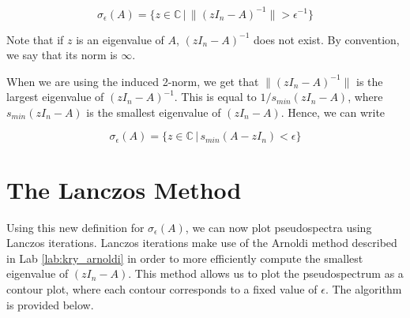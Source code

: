 \begin{equation}
\sigma _{\epsilon}(A) = \{ z \in \mathbb{C} \, | \, \lVert (zI_n-A)^{-1} \rVert > \epsilon ^{-1}\}	
\end{equation}

Note that if $z$ is an eigenvalue of $A$, $(zI_n-A)^{-1}$ does not exist. By convention, we say that its norm is $\infty$.

When we are using the induced 2-norm, we get that $\lVert (zI_n-A)^{-1} \rVert$ is the largest eigenvalue of $(zI_n-A)^{-1}$. This is equal to $1/s_{min}(zI_n-A)$, where $s_{min}(zI_n-A)$ is the smallest eigenvalue of $(zI_n-A)$. Hence, we can write

\begin{equation}
\sigma _{\epsilon}(A) = \{ z \in \mathbb{C} \, | \, s_{min}(A-zI_n) < \epsilon \}	
\end{equation}


\section*{The Lanczos Method}

Using this new definition for $\sigma _{\epsilon}(A)$, we can now plot pseudospectra using Lanczos iterations. Lanczos iterations make use of the Arnoldi method described in Lab \ref{lab:kry_arnoldi} in order to more efficiently compute the smallest eigenvalue of $(zI_n-A)$. This method allows us to plot the pseudospectrum as a contour plot, where each contour corresponds to a fixed value of $\epsilon$. The algorithm is provided below.

